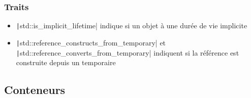 \documentclass[C++.tex]{subfiles}
\begin{document}
\begin{frame}[fragile]
	\frametitle{Traits}
	\begin{itemize}
		\item \texttt|std::is_implicit_lifetime| indique si un objet à une durée de vie implicite
		\item \texttt|std::reference_constructs_from_temporary| et \texttt|std::reference_converts_from_temporary| indiquent si la référence est construite depuis un temporaire
	\end{itemize}

\end{frame}

\subsection*{Conteneurs}
\end{document}
